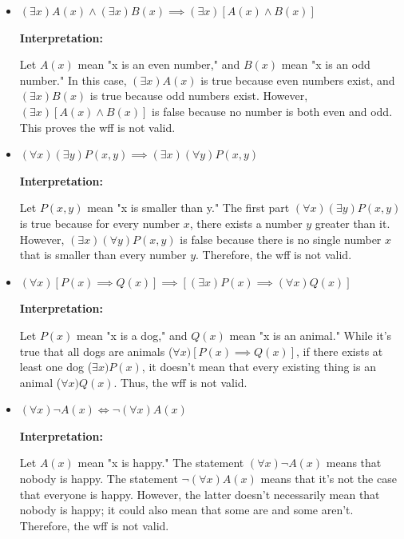 \documentclass[12pt]{article}
\begin{document}
\begin{itemize}
    \item[a.] \((\exists x)A(x) \land (\exists x)B(x) \implies (\exists x)[A(x) \land B(x)]\)
    
    \textbf{Interpretation:}
    
    Let \(A(x)\) mean "x is an even number," and \(B(x)\) mean "x is an odd number." In this case, \( (\exists x)A(x) \) is true because even numbers exist, and \( (\exists x)B(x) \) is true because odd numbers exist. However, \( (\exists x)[A(x) \land B(x)] \) is false because no number is both even and odd. This proves the wff is not valid.

    \item[b.] \((\forall x)(\exists y)P(x, y) \implies (\exists x)(\forall y)P(x, y)\)
    
    \textbf{Interpretation:}
    
    Let \(P(x, y)\) mean "x is smaller than y." The first part \( (\forall x)(\exists y)P(x, y) \) is true because for every number \( x \), there exists a number \( y \) greater than it. However, \( (\exists x)(\forall y)P(x, y) \) is false because there is no single number \( x \) that is smaller than every number \( y \). Therefore, the wff is not valid.

    \item[c.] \((\forall x)[P(x) \implies Q(x)] \implies [(\exists x)P(x) \implies (\forall x)Q(x)]\)
    
    \textbf{Interpretation:}
    
    Let \(P(x)\) mean "x is a dog," and \(Q(x)\) mean "x is an animal." While it's true that all dogs are animals (\(\forall x)[P(x) \implies Q(x)]\), if there exists at least one dog (\(\exists x)P(x)\), it doesn't mean that every existing thing is an animal (\(\forall x)Q(x)\). Thus, the wff is not valid.
    
    \item[d.] \((\forall x)\lnot A(x) \iff \lnot (\forall x)A(x)\)
    
    \textbf{Interpretation:}
    
    Let \(A(x)\) mean "x is happy." The statement \( (\forall x)\lnot A(x) \) means that nobody is happy. The statement \( \lnot (\forall x)A(x) \) means that it's not the case that everyone is happy. However, the latter doesn't necessarily mean that nobody is happy; it could also mean that some are and some aren't. Therefore, the wff is not valid.
\end{itemize}
\end{document}
